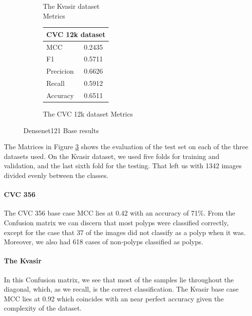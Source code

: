 \begin{figure}[h]
\begin{subfigure}[t]{0.49\textwidth}
\begin{tabular}{ll}
        \bottomrule
\end{tabular}
\caption{The Kvasir dataset\\ Metrics}
\label{tab:kvasir_metrics_DN121_base}
\end{subfigure}%
\begin{subfigure}[t]{0.25\textwidth}
        \begin{tabular}{ll}
        \toprule
        \multicolumn{2}{c}{CVC 12k dataset}        \\
        \midrule
        MCC 		& 0.2435  \\
        F1  		& 0.5711 \\
        Precicion  	& 0.6626 \\
        Recall     	& 0.5912 \\
        Accuracy	& 0.6511 \\
        \bottomrule
        \end{tabular}
\caption{The CVC 12k dataset Metrics}
\label{tab:cvc12k_metrics_DN121_base}
\end{subfigure}
\caption{Densenet121 Base results}
\label{fig:results_DN121_base}
\end{figure}




\noindent
The Matrices in Figure \ref{fig:results_DN121_base} shows the evaluation of the test set on each of the three datasets used. 
On the Kvasir dataset, we used five folds for training and validation, and the last sixth fold for the testing. That left us with 1342 images divided evenly between the classes. 

\paragraph{CVC 356}
The CVC 356 base case MCC lies at 0.42 with an accuracy of 71\%. 
From the Confusion matrix we can discern that most polyps were classified correctly, except for the case that 37 of the images did not classify as a polyp when it was. Moreover, we also had 618 cases of non-polyps classified as polyps.

\paragraph{The Kvasir}
In this Confusion matrix, we see that most of the samples lie throughout the diagonal, which, as we recall, is the correct classification. 
The Kvasir base case MCC lies at 0.92 which coincides with an near perfect accuracy given the complexity of the dataset.

